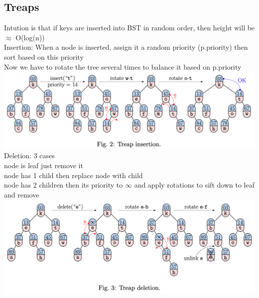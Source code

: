 \documentclass{article}
\begin{document}
  \subsection{Treaps}
  Intution is that if keys are inserted into BST in random order, then height will be $\approx$ O(log(n))\\
  Insertion: When a node is inserted, assign it a random priority (p.priority) then sort based on this priority\\
  \indent Now we have to rotate the tree several times to balance it based on p.priority\\
  \includegraphics[width=\textwidth]{TreapInsertion}
  Deletion: 3 cases\\
  \indent node is leaf just remove it\\
  \indent node has 1 child then replace node with child \\
  \indent node has 2 children then its priority to $\infty$ and apply rotations to sift down to leaf and remove\\
  \includegraphics[width=\textwidth]{TreapDeletion}
\end{document}
